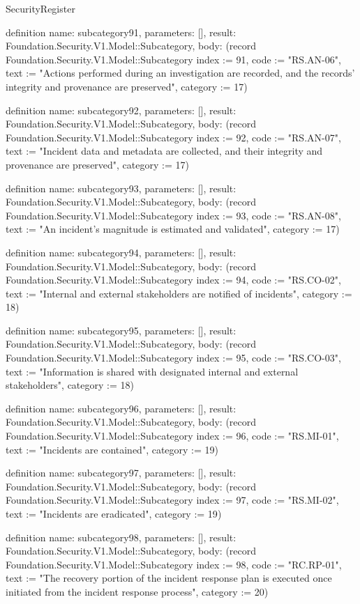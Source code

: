 \begin{lexlean}{SecurityRegister}
\begin{semanticmodule}
definition{
  name: subcategory91,
  parameters: [],
  result: Foundation.Security.V1.Model::Subcategory,
  body: (record Foundation.Security.V1.Model::Subcategory {index := 91, code := "RS.AN-06", text := "Actions performed during an investigation are recorded, and the records' integrity and provenance are preserved", category := 17})
}

definition{
  name: subcategory92,
  parameters: [],
  result: Foundation.Security.V1.Model::Subcategory,
  body: (record Foundation.Security.V1.Model::Subcategory {index := 92, code := "RS.AN-07", text := "Incident data and metadata are collected, and their integrity and provenance are preserved", category := 17})
}

definition{
  name: subcategory93,
  parameters: [],
  result: Foundation.Security.V1.Model::Subcategory,
  body: (record Foundation.Security.V1.Model::Subcategory {index := 93, code := "RS.AN-08", text := "An incident's magnitude is estimated and validated", category := 17})
}

definition{
  name: subcategory94,
  parameters: [],
  result: Foundation.Security.V1.Model::Subcategory,
  body: (record Foundation.Security.V1.Model::Subcategory {index := 94, code := "RS.CO-02", text := "Internal and external stakeholders are notified of incidents", category := 18})
}

definition{
  name: subcategory95,
  parameters: [],
  result: Foundation.Security.V1.Model::Subcategory,
  body: (record Foundation.Security.V1.Model::Subcategory {index := 95, code := "RS.CO-03", text := "Information is shared with designated internal and external stakeholders", category := 18})
}

definition{
  name: subcategory96,
  parameters: [],
  result: Foundation.Security.V1.Model::Subcategory,
  body: (record Foundation.Security.V1.Model::Subcategory {index := 96, code := "RS.MI-01", text := "Incidents are contained", category := 19})
}

definition{
  name: subcategory97,
  parameters: [],
  result: Foundation.Security.V1.Model::Subcategory,
  body: (record Foundation.Security.V1.Model::Subcategory {index := 97, code := "RS.MI-02", text := "Incidents are eradicated", category := 19})
}

definition{
  name: subcategory98,
  parameters: [],
  result: Foundation.Security.V1.Model::Subcategory,
  body: (record Foundation.Security.V1.Model::Subcategory {index := 98, code := "RC.RP-01", text := "The recovery portion of the incident response plan is executed once initiated from the incident response process", category := 20})
}


\end{semanticmodule}
\end{lexlean}

